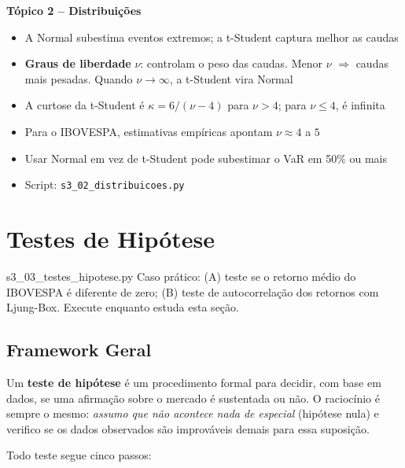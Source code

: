 \documentclass[11pt,a4paper]{article}
\newcommand{\code}[1]{%
  \colorbox{quantlightgray}{\texttt{\small\color{quantdark}#1}}%
}
\theoremstyle{quant}
\begin{document}
\begin{caixaresumo}
\textbf{Tópico 2 -- Distribuições}
\begin{itemize}
  \item A Normal subestima eventos extremos; a t-Student captura melhor as caudas
  \item \textbf{Graus de liberdade} $\nu$: controlam o peso das caudas. Menor $\nu$ $\Rightarrow$ caudas mais pesadas. Quando $\nu \to \infty$, a t-Student vira Normal
  \item A curtose da t-Student é $\kappa = 6/(\nu-4)$ para $\nu > 4$; para $\nu \leq 4$, é infinita
  \item Para o IBOVESPA, estimativas empíricas apontam $\nu \approx 4$ a $5$
  \item Usar Normal em vez de t-Student pode subestimar o VaR em 50\% ou mais
  \item Script: \code{s3\_02\_distribuicoes.py}
\end{itemize}
\end{caixaresumo}

\newpage

\section{Testes de Hipótese}
\label{sec:testes}

\begin{caixapy}{s3\_03\_testes\_hipotese.py}
  Caso prático: (A) teste se o retorno médio do IBOVESPA é diferente de zero;
  (B) teste de autocorrelação dos retornos com Ljung-Box.
  Execute enquanto estuda esta seção.
\end{caixapy}

\subsection{Framework Geral}

Um \textbf{teste de hipótese} é um procedimento formal para decidir, com base em
dados, se uma afirmação sobre o mercado é sustentada ou não. O raciocínio é sempre
o mesmo: \emph{assumo que não acontece nada de especial} (hipótese nula) e
verifico se os dados observados são improváveis demais para essa suposição.

Todo teste segue cinco passos:
\end{document}
